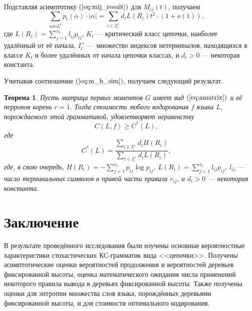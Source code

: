 \documentclass[12pt]{article}
\renewcommand{\geq}{\geqslant}
\newtheorem{theorem}{Теорема}
\begin{document}
{Подставляя асимптотику $(\ref{eq:mij_result})$ для $M_{ij}(t)$, получаем
\begin{equation*}
	\sum_{\alpha in L^t} p_t(\alpha) \cdot \left|\alpha\right| = \sum_{i \in I_l^+} d_i L(R_i) t^2 \cdot (1 + o(1)),
\end{equation*}
где $L(R_i) = \sum_{j = 1}^{n_i} l_{ij} p_{ij}$, $K_l$ --- критический класс цепочки, наиболее удалённый от её начала, $I_l^+$ --- множество индексов нетерминалов, находящихся в классе $K_l$ и более удалённых от начала цепочки классах, и $d_i > 0$ --- некоторая константа.

Учитывая соотношение $(\ref{eq:m_h_sim})$, получаем следующий результат.
\begin{theorem}
	Пусть матрица первых моментов $G$ имеет вид $(\ref{eq:amatrix})$ и её перронов корень $r = 1$. Тогда стоимость любого кодирования $f$ языка $L$, порождаемого этой грамматикой, удовлетворяет неравенству
	\begin{equation*}
		C(L, f) \geq C^*(L),
	\end{equation*}
	где
	\begin{equation*}
		C^*(L) = \frac{\sum_{i \in I_l^+} d_i H(R_i)}{\sum_{i \in I_l^+} d_i L(R_i)},
	\end{equation*}
	где, в свою очередь,
	$H(R_i) = - \sum_{j=1}^{n_i} p_{ij} \log p_{ij}$, $L(R_i) = \sum_{j = 1}^{n_i} l_{ij} p_{ij}$, $l_{ij}$ --- число терминальных символов в правой части правила $r_{ij}$, и $d_i > 0$ --- некоторая константа.
\end{theorem}


\newpage

\section{Заключение}

В результате проведённого исследования были изучены основные вероятностные характеристики стохастических КС-грамматик вида <<цепочки>>. Получены асимптотические оценки вероятностей продолжения и вероятностей деревьев фиксированной высоты, оценка математического ожидания числа применений некоторого правила вывода в деревьях фиксированной высоты. Также получены оценки для энтропии множества слов языка, порождённых деревьями фиксированной высоты, и для стоимости оптимального кодирования.

\newpage

}
\end{document}
